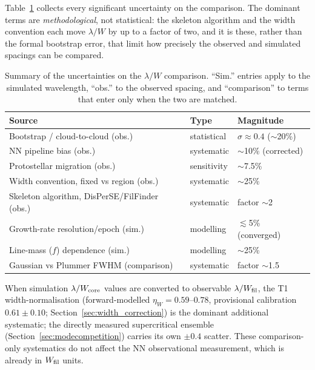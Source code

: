 \documentclass[usenatbib,twoside,twocolumn]{mnras}
\begin{document}
Table~\ref{tab:errorbudget} collects every significant uncertainty on the comparison. The dominant terms are \emph{methodological}, not statistical: the skeleton algorithm and the width convention each move $\lambda/W$ by up to a factor of two, and it is these, rather than the formal bootstrap error, that limit how precisely the observed and simulated spacings can be compared.

\begin{table}
\caption{Summary of the uncertainties on the $\lambda/W$ comparison. ``Sim.'' entries apply to the simulated wavelength, ``obs.'' to the observed spacing, and ``comparison'' to terms that enter only when the two are matched.}
\label{tab:errorbudget}
\footnotesize
\setlength{\tabcolsep}{3pt}
\begin{tabular}{p{3.6cm}p{1.9cm}p{1.7cm}}
\toprule
Source & Type & Magnitude \\
\midrule
Bootstrap / cloud-to-cloud (obs.) & statistical & $\sigma\approx0.4$ ($\sim$20\%) \\
NN pipeline bias (obs.) & systematic & $\sim$10\% (corrected) \\
Protostellar migration (obs.) & sensitivity & $\sim$7.5\% \\
Width convention, fixed vs region (obs.) & systematic & $\sim$25\% \\
Skeleton algorithm, DisPerSE/FilFinder (obs.) & systematic & factor $\sim$2 \\
Growth-rate resolution/epoch (sim.) & modelling & $\lesssim$5\% (converged) \\
Line-mass ($f$) dependence (sim.) & modelling & $\sim$25\% \\
Gaussian vs Plummer FWHM (comparison) & systematic & factor $\sim$1.5 \\
\bottomrule
\end{tabular}
\end{table}

When simulation $\lambda/W_{\rm core}$ values are converted to observable $\lambda/W_{\rm fil}$, the T1 width-normalisation (forward-modelled $\eta_W=0.59$--$0.78$, provisional calibration $0.61\pm0.10$; Section~\ref{sec:width_correction}) is the dominant additional systematic; the directly measured supercritical ensemble (Section~\ref{sec:modecompetition}) carries its own $\pm0.4$ scatter. These comparison-only systematics do not affect the NN observational measurement, which is already in $W_{\rm fil}$ units.
\end{document}
